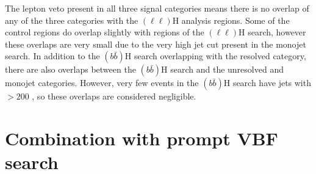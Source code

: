 The lepton veto present in all three signal categories means there is no overlap of any of the three categories with the \PZ$(\ell\ell)$H analysis regions. Some of the control regions do overlap slightly with regions of the \PZ$(\ell\ell)$H search, however these overlaps are very small due to the very high jet \pt cut present in the monojet search. In addition to the \PZ$(b\bar{b})$H search overlapping with the resolved category, there are also overlaps between the \PZ$(b\bar{b})$H search and the  unresolved and monojet categories. However, very few events in the \PZ$(b\bar{b})$H search have jets with \pt$>200$ \GeV, so these overlaps are considered negligible.



\section{Combination with prompt VBF search}
\label{sec:combprompt}

